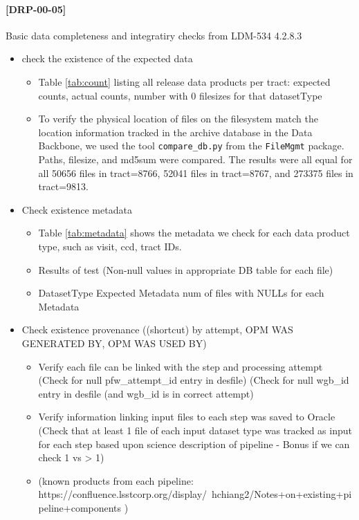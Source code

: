 \documentclass[DM,lsstdraft,STR,toc]{lsstdoc}
\begin{document}
\paragraph{[DRP-00-05]}
Basic data completeness and integratiry checks from LDM-534 4.2.8.3
\begin{itemize}
  \item check the existence of the expected data
  \begin{itemize}
    \item Table \ref{tab:count} listing all release data products per tract:  expected counts, actual counts, number with 0 filesizes for that datasetType
    \item To verify the physical location of files on the filesystem
	  match the location information tracked in the archive
	  database in the Data Backbone, we used the tool
	  \texttt{compare{\_}db.py} from the \texttt{FileMgmt}
	  package.  Paths, filesize, and md5sum were compared. The
	  results were all equal for all 50656 files in tract=8766,
	  52041 files in tract=8767, and 273375 files in tract=9813.
  \end{itemize}
  \item Check existence metadata
  \begin{itemize}
    \item Table \ref{tab:metadata} shows the metadata we check for each data product type, such as visit, ccd, tract IDs.

    \item Results of test (Non-null values in appropriate DB table for each file)
    \item DatasetType Expected Metadata num of files with NULLs for each Metadata
  \end{itemize}
  \item Check existence provenance ((shortcut) by attempt, OPM WAS GENERATED BY, OPM WAS USED BY)
  \begin{itemize}
    \item Verify each file can be linked with the step and processing attempt
          (Check for null pfw{\_}attempt{\_}id entry in desfile)
          (Check for null wgb{\_}id entry in desfile (and wgb{\_}id is in correct attempt)
    \item Verify information linking input files to each step was saved to Oracle
          (Check that at least 1 file of each input dataset type was tracked as input for each step based upon science description of pipeline - Bonus if we can check 1 vs > 1)
    \item (known products from each pipeline: https://confluence.lsstcorp.org/display/~hchiang2/Notes+on+existing+pipeline+components )

\end{itemize}
\end{itemize}
\end{document}

